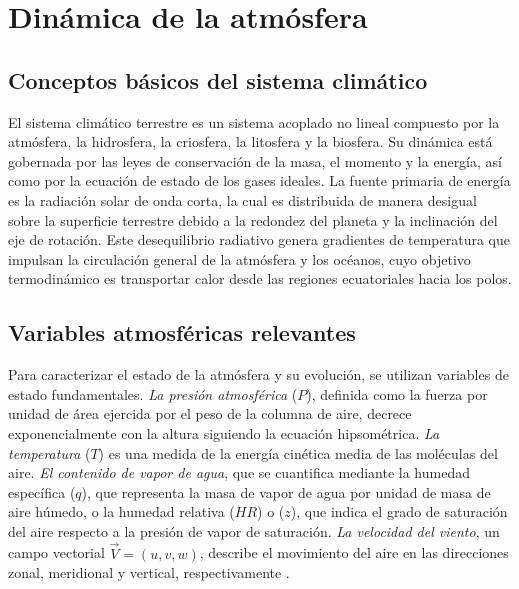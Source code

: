 \section{Dinámica de la atmósfera}

\subsection{Conceptos básicos del sistema climático}
El sistema climático terrestre es un sistema acoplado no lineal compuesto por la atmósfera, la hidrosfera, la criosfera, la litosfera y la biosfera. Su dinámica está gobernada por las leyes de conservación de la masa, el momento y la energía, así como por la ecuación de estado de los gases ideales. La fuente primaria de energía es la radiación solar de onda corta, la cual es distribuida de manera desigual sobre la superficie terrestre debido a la redondez del planeta y la inclinación del eje de rotación. Este desequilibrio radiativo genera gradientes de temperatura que impulsan la circulación general de la atmósfera y los océanos, cuyo objetivo termodinámico es transportar calor desde las regiones ecuatoriales hacia los polos.

\subsection{Variables atmosféricas relevantes}
Para caracterizar el estado de la atmósfera y su evolución, se utilizan variables de estado fundamentales. \textit{La presión atmosférica} (\(P\)), definida como la fuerza por unidad de área ejercida por el peso de la columna de aire, decrece exponencialmente con la altura siguiendo la ecuación hipsométrica. \textit{La temperatura} (\(T\)) es una medida de la energía cinética media de las moléculas del aire. \textit{El contenido de vapor de agua}, que se cuantifica mediante la humedad específica (\(q\)), que representa la masa de vapor de agua por unidad de masa de aire húmedo, o la humedad relativa (\(HR\)) o (\(z\)), que indica el grado de saturación del aire respecto a la presión de vapor de saturación. \textit{La velocidad del viento}, un campo vectorial \(\vec{V} = (u, v, w)\), describe el movimiento del aire en las direcciones zonal, meridional y vertical, respectivamente \citep{predictors, PCA, geopotentialselection}.

